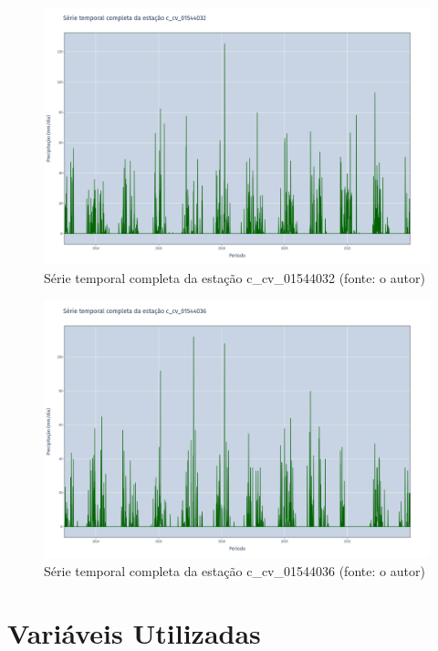\begin{figure}[!h]
\centering
\includegraphics[scale=0.25]{Figuras/rio_sao_francisco/franciscoSerieCompleta_c_cv_01544032.png}
\caption{Série temporal completa da estação c\_cv\_01544032 (fonte: o autor)}
\label{fig:franciscoSerieCompleta_c_cv_01544032}
\end{figure}

\begin{figure}[!h]
\centering
\includegraphics[scale=0.25]{Figuras/rio_sao_francisco/franciscoSerieCompleta_c_cv_01544036.png}
\caption{Série temporal completa da estação c\_cv\_01544036 (fonte: o autor)}
\label{fig:franciscoSerieCompleta_c_cv_01544036}
\end{figure}
\clearpage

\section{Variáveis Utilizadas}

